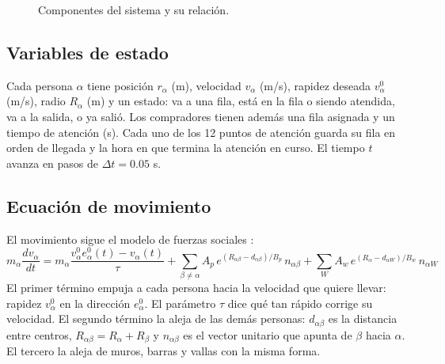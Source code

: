 \documentclass[11pt,letterpaper]{article}
\begin{document}
\begin{figure}[H]
\centering
{}
\caption{Componentes del sistema y su relación.}
\label{fig:diagrama}
\end{figure}

\subsection{Variables de estado}
Cada persona $\alpha$ tiene posición $r_\alpha$ (m), velocidad $v_\alpha$ (m/s), rapidez deseada $v^0_\alpha$ (m/s), radio $R_\alpha$ (m) y un estado: va a una fila, está en la fila o siendo atendida, va a la salida, o ya salió. Los compradores tienen además una fila asignada y un tiempo de atención (s). Cada uno de los 12 puntos de atención guarda su fila en orden de llegada y la hora en que termina la atención en curso. El tiempo $t$ avanza en pasos de $\Delta t = 0.05$ s.

\subsection{Ecuación de movimiento}
El movimiento sigue el modelo de fuerzas sociales \citep{helbing1995,helbing2000}:
\begin{equation}
m_\alpha \frac{dv_\alpha}{dt} = m_\alpha \frac{v_\alpha^0 e_\alpha^0(t) - v_\alpha(t)}{\tau} + \sum_{\beta \neq \alpha} A_p\, e^{(R_{\alpha\beta} - d_{\alpha\beta})/B_p}\, n_{\alpha\beta} + \sum_{W} A_w\, e^{(R_\alpha - d_{\alpha W})/B_w}\, n_{\alpha W}
\end{equation}
El primer término empuja a cada persona hacia la velocidad que quiere llevar: rapidez $v^0_\alpha$ en la dirección $e^0_\alpha$. El parámetro $\tau$ dice qué tan rápido corrige su velocidad. El segundo término la aleja de las demás personas: $d_{\alpha\beta}$ es la distancia entre centros, $R_{\alpha\beta} = R_\alpha + R_\beta$ y $n_{\alpha\beta}$ es el vector unitario que apunta de $\beta$ hacia $\alpha$. El tercero la aleja de muros, barras y vallas con la misma forma.
\end{document}
